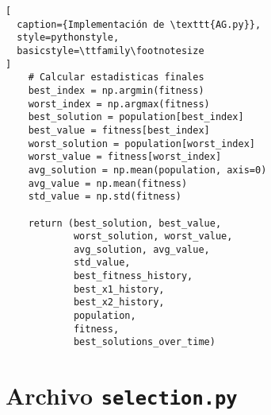 \begin{lstlisting}[
  caption={Implementación de \texttt{AG.py}},
  style=pythonstyle,
  basicstyle=\ttfamily\footnotesize
]
    # Calcular estadisticas finales
    best_index = np.argmin(fitness)
    worst_index = np.argmax(fitness)
    best_solution = population[best_index]
    best_value = fitness[best_index]
    worst_solution = population[worst_index]
    worst_value = fitness[worst_index]
    avg_solution = np.mean(population, axis=0)
    avg_value = np.mean(fitness)
    std_value = np.std(fitness)
    
    return (best_solution, best_value,
            worst_solution, worst_value,
            avg_solution, avg_value,
            std_value,
            best_fitness_history,
            best_x1_history,
            best_x2_history,
            population,
            fitness,
            best_solutions_over_time)
\end{lstlisting}

\section{Archivo \texttt{selection.py}}
